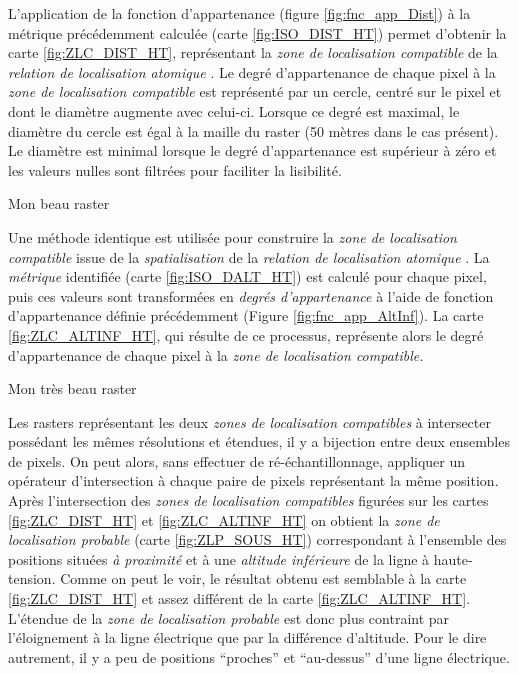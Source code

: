 L’application de la fonction d'appartenance (figure
\ref{fig:fnc_app_Dist}) à la métrique précédemment calculée (carte
\ref{fig:ISO_DIST_HT}) permet d'obtenir la carte
\ref{fig:ZLC_DIST_HT}, représentant la \emph{zone de localisation
  compatible} de la \emph{relation de localisation atomique}
.
Le degré d'appartenance de chaque pixel à la \emph{zone de
  localisation compatible} est représenté par un cercle, centré sur le
pixel et dont le diamètre augmente avec celui-ci. Lorsque ce degré est
maximal, le diamètre du cercle est égal à la maille du raster (50
mètres dans le cas présent). Le diamètre est minimal lorsque le degré
d'appartenance est supérieur à zéro et les valeurs nulles sont
filtrées pour faciliter la lisibilité.

\begin{carte}
  \centering
  
  \caption{Mon beau raster}
  \label{fig:ZLC_DIST_HT}
\end{carte}

Une méthode identique est utilisée pour construire la \emph{zone de
  localisation compatible} issue de la \emph{spatialisation} de la
\emph{relation de localisation atomique}
. La
\emph{métrique} identifiée (carte \ref{fig:ISO_DALT_HT}) est calculé
pour chaque pixel, puis ces valeurs sont transformées en \emph{degrés
  d'appartenance} à l'aide de fonction d'appartenance définie
précédemment (Figure \ref{fig:fnc_app_AltInf}). La carte
\ref{fig:ZLC_ALTINF_HT}, qui résulte de ce processus, représente alors
le degré d'appartenance de chaque pixel à la \emph{zone de
  localisation compatible.}

\begin{carte}
  \centering
  
  \caption{Mon très beau raster}
  \label{fig:ZLC_ALTINF_HT}
\end{carte}

Les rasters représentant les deux \emph{zones de localisation
  compatibles} à intersecter possédant les mêmes résolutions et
étendues, il y a bijection entre deux ensembles de pixels. On peut
alors, sans effectuer de ré-échantillonnage, appliquer un opérateur
d'intersection à chaque paire de pixels représentant la même
position. Après l'intersection des \emph{zones de localisation
  compatibles} figurées sur les cartes \ref{fig:ZLC_DIST_HT} et
\ref{fig:ZLC_ALTINF_HT} on obtient la \emph{zone de localisation
  probable} (carte \ref{fig:ZLP_SOUS_HT}) correspondant à l'ensemble
des positions situées \emph{à proximité} et à une \emph{altitude
  inférieure} de la ligne à haute-tension. Comme on peut le voir, le
résultat obtenu est semblable à la carte \ref{fig:ZLC_DIST_HT} et
assez différent de la carte \ref{fig:ZLC_ALTINF_HT}. L'étendue de la
\emph{zone de localisation probable} est donc plus contraint par
l'éloignement à la ligne électrique que par la différence
d'altitude. Pour le dire autrement, il y a peu de positions
\enquote{proches} et \enquote{au-dessus} d'une ligne électrique.

